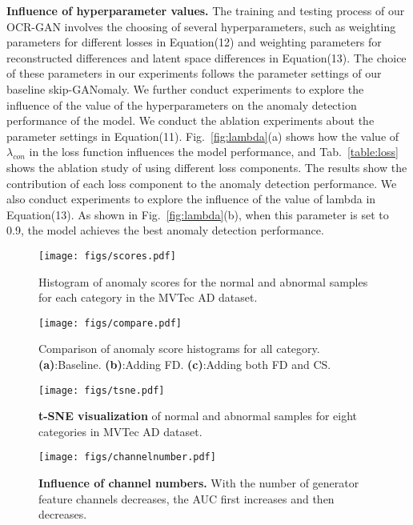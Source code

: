 \documentclass[lettersize,journal]{IEEEtran}
\begin{document}
\noindent\textbf{Influence of hyperparameter values.} 
The training and testing process of our OCR-GAN involves the choosing of several hyperparameters, such as weighting parameters for different losses in Equation(12) and weighting parameters for reconstructed differences and latent space differences in Equation(13). The choice of these parameters in our experiments follows the parameter settings of our baseline skip-GANomaly. We further conduct experiments to explore the influence of the value of the hyperparameters on the anomaly detection performance of the model.
We conduct the ablation experiments about the parameter settings in Equation(11). Fig.~\ref{fig:lambda}(a) shows how the value of $\lambda_{con}$ in the loss function influences the model performance, and Tab.~\ref{table:loss} shows the ablation study of using different loss components. The results show the contribution of each loss component to the anomaly detection performance.
We also conduct experiments to explore the influence of the value of lambda in Equation(13). As shown in Fig.~\ref{fig:lambda}(b), when this parameter is set to 0.9, the model achieves the best anomaly detection performance. 



\begin{figure*}[t]
    \centering
    \texttt{[image: figs/scores.pdf]} 
    \caption{Histogram of anomaly scores for the normal and abnormal samples for each category in the MVTec AD dataset.}
    \label{fig:scores}
\end{figure*}
\begin{figure*}[t]
	\centering
	\texttt{[image: figs/compare.pdf]}
	\caption{Comparison of anomaly score histograms for all category. \textbf{(a)}:Baseline. \textbf{(b)}:Adding FD. \textbf{(c)}:Adding both FD and CS.}
	\label{fig:com_score}
\end{figure*}

\begin{figure*}[tp]
	\centering
	\texttt{[image: figs/tsne.pdf]}
	\caption{\textbf{t-SNE visualization} of normal and abnormal samples for eight categories in MVTec AD dataset.}
	\label{fig:tsne}
\end{figure*}

\begin{figure}[t]
	\centering
	\texttt{[image: figs/channelnumber.pdf]}
	\caption{\textbf{Influence of channel numbers.} With the number of generator feature channels decreases, the AUC first increases and then decreases.}
	\label{fig:channel}
\end{figure}
\end{document}
